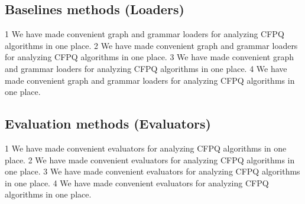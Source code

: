 \subsection{Baselines methods (Loaders)}
1 We have made convenient graph and grammar loaders for analyzing CFPQ algorithms in one place.
2 We have made convenient graph and grammar loaders for analyzing CFPQ algorithms in one place.
3 We have made convenient graph and grammar loaders for analyzing CFPQ algorithms in one place.
4 We have made convenient graph and grammar loaders for analyzing CFPQ algorithms in one place.

\subsection{Evaluation methods (Evaluators)}
1 We have made convenient evaluators for analyzing CFPQ algorithms in one place.
2 We have made convenient evaluators for analyzing CFPQ algorithms in one place.
3 We have made convenient evaluators for analyzing CFPQ algorithms in one place.
4 We have made convenient evaluators for analyzing CFPQ algorithms in one place.
